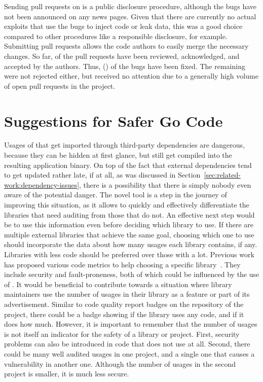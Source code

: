 

Sending pull requests on \github{} is a public disclosure procedure, although the bugs have not been announced on any
news pages.
Given that there are currently no actual exploits that use the bugs to inject code or leak data, this was a good choice
compared to other procedures like a responsible disclosure, for example.
Submitting \github{} pull requests allows the code authors to easily merge the necessary changes.
So far, \numberPRsMerged{} of the pull requests have been reviewed, acknowledged, and accepted by the authors.
Thus, \numberBugsMerged{} (\fractionBugsMerged{}) of the bugs have been fixed.
The remaining were not rejected either, but received no attention due to a generally high volume of open pull requests
in the project.



\section{Suggestions for Safer Go Code}\label{sec:discussion:safer-go-code}

Usages of \unsafe{} that get imported through third-party dependencies are dangerous, because they can be hidden at
first glance, but still get compiled into the resulting application binary.
On top of the fact that external dependencies tend to get updated rather late, if at all, as was discussed in
Section~\ref{sec:related-work:dependency-issues}, there is a possibility that there is simply nobody even aware of the
potential danger.
The novel tool \toolGeiger{} is a step in the journey of improving this situation, as it allows to quickly and
effectively differentiate the libraries that need auditing from those that do not.
An effective next step would be to use this information even before deciding which library to use.
If there are multiple external libraries that achieve the same goal, choosing which one to use should incorporate the
data about how many \unsafe{} usages each library contains, if any.
Libraries with less \unsafe{} code should be preferred over those with a lot.
Previous work has proposed various code metrics to help choosing a specific library~\cite{delamora2018}.
They include security and fault-proneness, both of which could be influenced by the use of \unsafe{}.
It would be beneficial to contribute towards a situation where library maintainers use the number of \unsafe{} usages
in their library as a feature or part of its advertisement.
Similar to code quality report badges on the \github{} repository of the project, there could be a badge showing if the
library uses any \unsafe{} code, and if it does how much.
However, it is important to remember that the number of \unsafe{} usages is not itself an indicator for the safety of
a library or project.
First, security problems can also be introduced in code that does not use \unsafe{} at all.
Second, there could be many well audited \unsafe{} usages in one project, and a single one that causes a vulnerability
in another one.
Although the number of \unsafe{} usages in the second project is smaller, it is much less secure.


